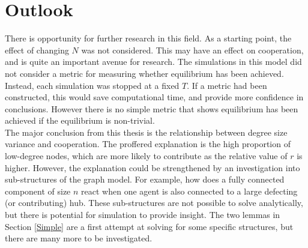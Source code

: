 \section{Outlook}
There is opportunity for further research in this field. As a starting point, the effect of changing $N$ was not considered. This may have an effect on cooperation, and is quite an important avenue for research. The simulations in this model did not consider a metric for measuring whether equilibrium has been achieved. Instead, each simulation was stopped at a fixed $T$. If a metric had been constructed, this would save computational time, and provide more confidence in conclusions. However there is no simple metric that shows equilibrium has been achieved if the equilibrium is non-trivial. \\

The major conclusion from this thesis is the relationship between degree size variance and cooperation. The proffered explanation is the high proportion of low-degree nodes, which are more likely to contribute as the relative value of $r$ is higher. However, the explanation could be strengthened by an investigation into sub-structures of the graph model. For example, how does a fully connected component of size $n$ react when one agent is also connected to a large defecting (or contributing) hub. These sub-structures are not possible to solve analytically, but there is potential for simulation to provide insight. The two lemmas in Section \ref{Simple} are a first attempt at solving for some specific structures, but there are many more to be investigated. \\




